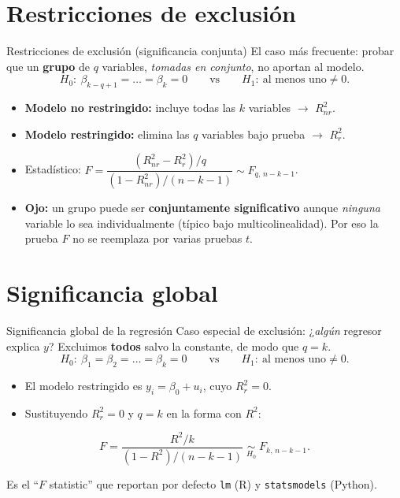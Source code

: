 \documentclass{beamer}
\begin{document}
\section{Restricciones de exclusión}

\begin{frame}{Restricciones de exclusión (significancia conjunta)}
El caso más frecuente: probar que un \textbf{grupo} de $q$ variables, \emph{tomadas en conjunto}, no aportan al modelo.
\[
   H_0:\ \beta_{k-q+1} = \dots = \beta_k = 0 \qquad\text{vs}\qquad H_1:\ \text{al menos uno} \neq 0.
\]
\begin{itemize}
    \item \textbf{Modelo no restringido:} incluye todas las $k$ variables $\to$ $R^2_{nr}$.
    \pause
    \item \textbf{Modelo restringido:} elimina las $q$ variables bajo prueba $\to$ $R^2_{r}$.
    \pause
    \item Estadístico: $F = \dfrac{(R^2_{nr}-R^2_r)/q}{(1-R^2_{nr})/(n-k-1)} \sim F_{q,\,n-k-1}$.
    \pause
    \item \textbf{Ojo:} un grupo puede ser \textbf{conjuntamente significativo} aunque \emph{ninguna} variable lo sea individualmente (típico bajo multicolinealidad). Por eso la prueba $F$ no se reemplaza por varias pruebas $t$.
\end{itemize}
\end{frame}

\section{Significancia global}

\begin{frame}{Significancia global de la regresión}
Caso especial de exclusión: ¿\emph{algún} regresor explica $y$? Excluimos \textbf{todos} salvo la constante, de modo que $q=k$.
\[
   H_0:\ \beta_1 = \beta_2 = \dots = \beta_k = 0 \qquad\text{vs}\qquad H_1:\ \text{al menos uno}\neq 0.
\]
\begin{itemize}
    \item El modelo restringido es $y_i = \beta_0 + u_i$, cuyo $R^2_r = 0$.
    \pause
    \item Sustituyendo $R^2_r=0$ y $q=k$ en la forma con $R^2$:
\end{itemize}
\begin{tcolorbox}[colback=blue!5!white, colframe=blue!75!black, title=$F$ de significancia global]
\[
   F = \frac{R^2/k}{(1-R^2)/(n-k-1)} \;\underset{H_0}{\sim}\; F_{k,\,n-k-1}.
\]
\end{tcolorbox}
{\small Es el ``$F$ statistic'' que reportan por defecto \texttt{lm} (R) y \texttt{statsmodels} (Python).}
\end{frame}
\end{document}

